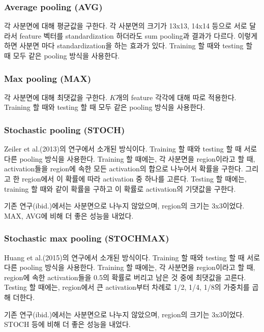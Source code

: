 \documentclass[a4paper,9pt]{article}
\begin{document}
\begin{multicols*}{2}
\subsubsection{Average pooling (AVG)}

각 사분면에 대해 평균값을 구한다.
각 사분면의 크기가 13x13, 14x14 등으로 서로 달라서 feature 벡터를 standardization 하더라도 sum pooling과 결과가 다르다.
이렇게 하면 사분면 마다 standardization을 하는 효과가 있다.
Training 할 때와 testing 할 때 모두 같은 pooling 방식을 사용한다.

\subsubsection{Max pooling (MAX)}

각 사분면에 대해 최댓값을 구한다.
$K$개의 feature 각각에 대해 따로 적용한다.
Training 할 때와 testing 할 때 모두 같은 pooling 방식을 사용한다.

\subsubsection{Stochastic pooling (STOCH)}

Zeiler et al.(2013)의 연구에서 소개된 방식이다.
Training 할 때와 testing 할 때 서로 다른 pooling 방식을 사용한다.
Training 할 때에는, 각 사분면을 region이라고 할 때, activation들을 region에 속한 모든 activation의 합으로 나누어서 확률을 구한다.
그리고 한 region에서 이 확률에 따라 activation 중 하나를 고른다.
Testing 할 때에는, training 할 때와 같이 확률을 구하고 이 확률로 activation의 기댓값을 구한다.

기존 연구(ibid.)에서는 사분면으로 나누지 않았으며, region의 크기는 3x3이었다. MAX, AVG에 비해 더 좋은 성능을 내었다.

\subsubsection{Stochastic max pooling (STOCHMAX)}

Huang et al.(2015)의 연구에서 소개된 방식이다.
Training 할 때와 testing 할 때 서로 다른 pooling 방식을 사용한다.
Training 할 때에는, 각 사분면을 region이라고 할 때, region에 속한 activation들을 0.5의 확률로 버리고 남은 것 중에 최댓값을 고른다.
Testing 할 때에는, region에서 큰 activation부터 차례로 1/2, 1/4, 1/8의 가중치를 곱해 더한다.

기존 연구(ibid.)에서는 사분면으로 나누지 않았으며, region의 크기는 3x3이었다. STOCH 등에 비해 더 좋은 성능을 내었다.


\end{multicols*}
\end{document}
